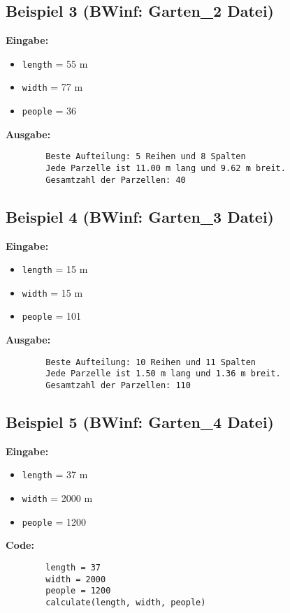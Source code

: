 \documentclass[a4paper,10pt,ngerman]{scrartcl}
\begin{document}
	\subsection{Beispiel 3 (BWinf: Garten\_2 Datei)}
	\textbf{Eingabe:}
	\begin{itemize}
		\item \texttt{length} = 55 m
		\item \texttt{width} = 77 m
		\item \texttt{people} = 36
	\end{itemize}
	
	\textbf{Ausgabe:}
	\begin{verbatim}
		Beste Aufteilung: 5 Reihen und 8 Spalten
		Jede Parzelle ist 11.00 m lang und 9.62 m breit.
		Gesamtzahl der Parzellen: 40
	\end{verbatim}
	
	\subsection{Beispiel 4 (BWinf: Garten\_3 Datei)}
	\textbf{Eingabe:}
	\begin{itemize}
		\item \texttt{length} = 15 m
		\item \texttt{width} = 15 m
		\item \texttt{people} = 101
	\end{itemize}
	
	\textbf{Ausgabe:}
	\begin{verbatim}
		Beste Aufteilung: 10 Reihen und 11 Spalten
		Jede Parzelle ist 1.50 m lang und 1.36 m breit.
		Gesamtzahl der Parzellen: 110
	\end{verbatim}
	
	\subsection{Beispiel 5 (BWinf: Garten\_4 Datei)}
	
	\textbf{Eingabe:}
	\begin{itemize}
		\item \texttt{length} = 37 m
		\item \texttt{width} = 2000 m
		\item \texttt{people} = 1200
	\end{itemize}
	
	\textbf{Code:}
	\begin{lstlisting}
		length = 37
		width = 2000
		people = 1200
		calculate(length, width, people)
	\end{lstlisting}
	
\end{document}
